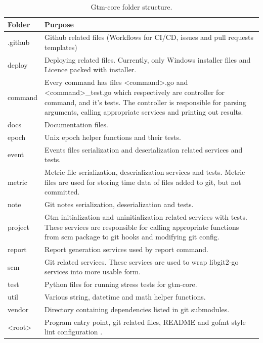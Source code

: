 \begin{table}[h]
    \centering
    \begin{tabular}{ | p{3cm} | p{10cm} |}
        \hline
        Folder & Purpose\\
        \hline
        .github & Github related files (Workflows for CI/CD, issues and pull requests templates)\\
        \hline
        deploy & Deploying related files.
        Currently, only Windows installer files and Licence packed with installer.\\
        \hline
        command & Every command has files <command>.go and <command>\_test.go which respectively are controller for command, and it's tests.
        The controller is responsible for parsing arguments, calling appropriate services and printing out results.\\
        \hline
        docs & Documentation files.\\
        \hline
        epoch & Unix epoch helper functions and their tests.\\
        \hline
        event & Events files serialization and deserialization related services and tests.\\
        \hline
        metric & Metric file serialization, deserialization services and tests.
        Metric files are used for storing time data of files added to git, but not committed.\\
        \hline
        note & Git notes serialization, deserialization and tests.\\
        \hline
        project & Gtm initialization and uninitialization related services with tests.
        These services are responsible for calling appropriate functions from scm package to git hooks and modifying git config.\\
        \hline
        report & Report generation services used by report command.\\
        \hline
        scm & Git related services.
        These services are used to wrap libgit2-go services into more usable form.\\
        \hline
        test & Python files for running stress tests for gtm-core.\\
        \hline
        util & Various string, datetime and math helper functions.\\
        \hline
        vendor & Directory containing dependencies listed in git submodules.\\
        \hline
        <root> & Program entry point, git related files, README and gofmt style lint configuration .\\
        \hline
    \end{tabular}
    \caption{Gtm-core folder structure.}
    \label{tab:gtm-core-folder-structure}
\end{table}

